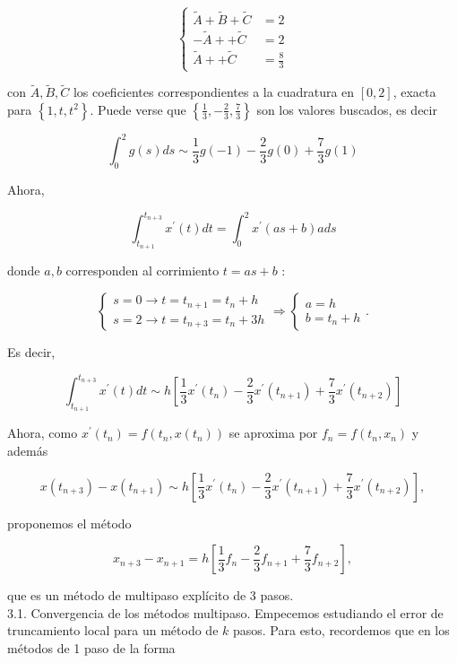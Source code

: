 \documentclass[10pt]{book}
\begin{document}
$$
\left\{\begin{aligned}
\tilde{A}+\tilde{B}+\tilde{C} & =2 \\
-\tilde{A}++\tilde{C} & =2 \\
\tilde{A}++\tilde{C} & =\frac{8}{3}
\end{aligned}\right.
$$

con $\tilde{A}, \tilde{B}, \tilde{C}$ los coeficientes correspondientes a la cuadratura en $[0,2]$, exacta para $\left\{1, t, t^{2}\right\}$. Puede verse que $\left\{\frac{1}{3},-\frac{2}{3}, \frac{7}{3}\right\}$ son los valores buscados, es decir

$$
\int_{0}^{2} g(s) d s \sim \frac{1}{3} g(-1)-\frac{2}{3} g(0)+\frac{7}{3} g(1)
$$

Ahora,

$$
\int_{t_{n+1}}^{t_{n+3}} x^{\prime}(t) d t=\int_{0}^{2} x^{\prime}(a s+b) a d s
$$

donde $a, b$ corresponden al corrimiento $t=a s+b$ :

$$
\left\{\begin{array} { l } 
{ s = 0 \rightarrow t = t _ { n + 1 } = t _ { n } + h } \\
{ s = 2 \rightarrow t = t _ { n + 3 } = t _ { n } + 3 h }
\end{array} \Rightarrow \left\{\begin{array}{l}
a=h \\
b=t_{n}+h
\end{array} .\right.\right.
$$

Es decir,

$$
\int_{t_{n+1}}^{t_{n+3}} x^{\prime}(t) d t \sim h\left[\frac{1}{3} x^{\prime}\left(t_{n}\right)-\frac{2}{3} x^{\prime}\left(t_{n+1}\right)+\frac{7}{3} x^{\prime}\left(t_{n+2}\right)\right]
$$

Ahora, como $x^{\prime}\left(t_{n}\right)=f\left(t_{n}, x\left(t_{n}\right)\right)$ se aproxima por $f_{n}=f\left(t_{n}, x_{n}\right)$ y además

$$
x\left(t_{n+3}\right)-x\left(t_{n+1}\right) \sim h\left[\frac{1}{3} x^{\prime}\left(t_{n}\right)-\frac{2}{3} x^{\prime}\left(t_{n+1}\right)+\frac{7}{3} x^{\prime}\left(t_{n+2}\right)\right],
$$

proponemos el método

$$
x_{n+3}-x_{n+1}=h\left[\frac{1}{3} f_{n}-\frac{2}{3} f_{n+1}+\frac{7}{3} f_{n+2}\right],
$$

que es un método de multipaso explícito de 3 pasos.\\
3.1. Convergencia de los métodos multipaso. Empecemos estudiando el error de truncamiento local para un método de $k$ pasos. Para esto, recordemos que en los métodos de 1 paso de la forma
\end{document}
